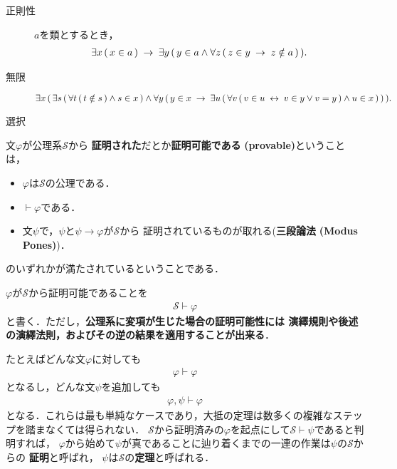\begin{description}
		\item[正則性] $a$を類とするとき，
			\begin{align}
				\exists x\, (\, x \in a\, ) \hspace{0.25em}\rightarrow\hspace{0.25em}
				\exists y\, (\, y \in a \wedge \forall z\, (\, z \in y \hspace{0.25em}\rightarrow\hspace{0.25em}
				z \notin a\, )\, ).
			\end{align}
			
		\item[無限] $\exists x\, (\, 
				\exists s\, (\, \forall t\, (\, t \notin s\, ) \wedge s \in x\, ) 
				\wedge \forall y\, (\, 
				y \in x \hspace{0.25em}\rightarrow\hspace{0.25em} \exists u\, (\, 
				\forall v\, (\, v \in u \hspace{0.25em}\leftrightarrow\hspace{0.25em} v \in y \vee v = y\, )
				\wedge u \in x\, )\, )\, ).$
			
		\item[選択]
			
	\end{description}
	
	\begin{screen}
		\begin{metadfn}[証明可能]
			文$\varphi$が公理系$\mathscr{S}$から
			{\bf 証明された}だとか{\bf 証明可能である}
			{\bf (provable)}ということは，
			\begin{itemize}
				\item $\varphi$は$\mathscr{S}$の公理である．
				\item $\vdash \varphi$である．
				\item 文$\psi$で，$\psi$と$\psi \rightarrow \varphi$が$\mathscr{S}$から
				証明されているものが取れる({\bf 三段論法}
				{\bf (Modus Pones)})．
			\end{itemize}
			のいずれかが満たされているということである．
		\end{metadfn}
	\end{screen}		
	
	$\varphi$が$\mathscr{S}$から証明可能であることを
	\begin{align}
		\mathscr{S} \vdash \varphi
	\end{align}
	と書く．ただし，{\bf 公理系に変項が生じた場合の証明可能性には
	演繹規則や後述の演繹法則，およびその逆の結果を適用することが出来る}．
	
	たとえばどんな文$\varphi$に対しても
	\begin{align}
		\varphi \vdash \varphi
	\end{align}
	となるし，どんな文$\psi$を追加しても
	\begin{align}
		\varphi,\psi \vdash \varphi
	\end{align}
	となる．これらは最も単純なケースであり，大抵の定理は数多くの複雑なステップを踏まなくては得られない．
	$\mathscr{S}$から証明済みの$\varphi$を起点にして$\mathscr{S} \vdash \psi$であると判明すれば，
	$\varphi$から始めて$\psi$が真であることに辿り着くまでの一連の作業は$\psi$の$\mathscr{S}$からの
	{\bf 証明}と呼ばれ，
	$\psi$は$\mathscr{S}$の{\bf 定理}と呼ばれる．
	
